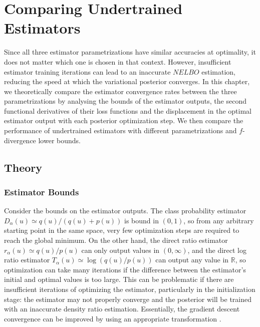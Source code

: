\documentclass[honours,12pt, twoside]{unswthesis}
\newcommand{\R}{\mathbb{R}}
\numberwithin{equation}{section}
\theoremstyle{definition}
\begin{document}
\chapter{Comparing Undertrained Estimators}\label{ch7}
Since all three estimator parametrizations have similar accuracies at optimality, it does not matter which one is chosen in that context. However, insufficient estimator training iterations can lead to an inaccurate $NELBO$ estimation, reducing the speed at which the variational posterior converges. In this chapter, we theoretically compare the estimator convergence rates between the three parametrizations by analysing the bounds of the estimator outputs, the second functional derivatives of their loss functions and the displacement in the optimal estimator output with each posterior optimization step. We then compare the performance of undertrained estimators with different parametrizations and $f$-divergence lower bounds.
\section{Theory}\label{sec:7.1}
\subsection{Estimator Bounds}
Consider the bounds on the estimator outputs. The class probability estimator $D_\alpha(u)\simeq q(u)/(q(u)+p(u))$ is bound in $(0,1)$, so from any arbitrary starting point in the same space, very few optimization steps are required to reach the global minimum. On the other hand, the direct ratio estimator $r_\alpha(u)\simeq q(u)/p(u)$ can only output values in $(0,\infty)$, and the direct log ratio estimator $T_\alpha(u) \simeq \log (q(u)/p(u))$ can output any value in $\R$, so optimization can take many iterations if the difference between the estimator's initial and optimal values is too large. This can be problematic if there are insufficient iterations of optimizing the estimator, particularly in the initialization stage: the estimator may not properly converge and the posterior will be trained with an inaccurate density ratio estimation. Essentially, the gradient descent convergence can be improved by using an appropriate transformation \citep{lecun}.
\end{document}
